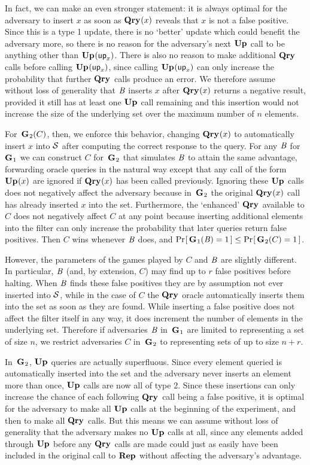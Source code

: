 In fact, we can make an even stronger statement: it is always optimal for the
adversary to insert $x$ as soon as $\textup{\textbf{Qry}}\hspace{0.5pt}(x)$ reveals that $x$ is not a false
positive. Since this is a type 1 update, there is no `better' update which could
benefit the adversary more, so there is no reason for the adversary's next
$\textup{\textbf{Up}}\hspace{0.5pt}$ call to be anything other than $\textup{\textbf{Up}}\hspace{0.5pt}(\mathsf{up}_x)$. There is also no reason to
make additional $\textup{\textbf{Qry}}\hspace{0.5pt}$ calls before calling $\textup{\textbf{Up}}\hspace{0.5pt}(\mathsf{up}_x)$, since calling
$\textup{\textbf{Up}}\hspace{0.5pt}(\mathsf{up}_x)$ can only increase the probability that further $\textup{\textbf{Qry}}\hspace{0.5pt}$ calls
produce an error. We therefore assume without loss of generality that $\mathit{B}$
inserts $x$ after $\textup{\textbf{Qry}}\hspace{0.5pt}(x)$ returns a negative result, provided it still has at
least one $\textup{\textbf{Up}}\hspace{0.5pt}$ call remaining and this insertion would not increase the size
of the underlying set over the maximum number of $n$ elements.

For~$\textup{\textbf{G}}\hspace{0.5pt}_2(C)$, then, we enforce this behavior, changing $\textup{\textbf{Qry}}\hspace{0.5pt}(x)$ to automatically insert $x$ into $\mathcal{S}$ after computing the correct response to the query. For any $\mathit{B}$ for~$\textup{\textbf{G}}\hspace{0.5pt}_1$ we can construct $C$ for~$\textup{\textbf{G}}\hspace{0.5pt}_2$ that simulates $\mathit{B}$ to attain the same advantage, forwarding oracle queries in the natural way except that any call of the form $\textup{\textbf{Up}}\hspace{0.5pt}(x)$ are ignored if $\textup{\textbf{Qry}}\hspace{0.5pt}(x)$ has been called previously. Ignoring these $\textup{\textbf{Up}}\hspace{0.5pt}$ calls does not negatively affect the adversary because in~$\textup{\textbf{G}}\hspace{0.5pt}_2$ the original $\textup{\textbf{Qry}}\hspace{0.5pt}(x)$ call has already inserted $x$ into the set. Furthermore, the `enhanced' $\textup{\textbf{Qry}}\hspace{0.5pt}$ available to $C$ does not negatively affect $C$ at any point because inserting additional elements into the filter can only increase the probability that later queries return false positives. Then $C$ wins whenever $\mathit{B}$ does, and $\Pr\hspace{-1pt}\left[\,\textup{\textbf{G}}\hspace{0.5pt}_1(\mathit{B}) = 1\,\right] \le \Pr\hspace{-1pt}\left[\,\textup{\textbf{G}}\hspace{0.5pt}_2(C) = 1\,\right]$.

However, the parameters of the games played by $C$ and $\mathit{B}$ are slightly different. In particular, $\mathit{B}$ (and, by extension, $C$) may find up to $r$ false positives before halting. When $\mathit{B}$ finds these false positives they are by assumption not ever inserted into $\mathcal{S}$, while in the case of $C$ the $\textup{\textbf{Qry}}\hspace{0.5pt}$ oracle automatically inserts them into the set as soon as they are found. While inserting a false positive does not affect the filter itself in any way, it does increment the number of elements in the underlying set. Therefore if adversaries $\mathit{B}$ in~$\textup{\textbf{G}}\hspace{0.5pt}_1$ are limited to representing a set of size $n$, we restrict adversaries $C$ in~$\textup{\textbf{G}}\hspace{0.5pt}_2$ to representing sets of up to size $n+r$.

In~$\textup{\textbf{G}}\hspace{0.5pt}_2$, $\textup{\textbf{Up}}\hspace{0.5pt}$ queries are actually superfluous. Since every element queried is automatically inserted into the set and the adversary never inserts an element more than once, $\textup{\textbf{Up}}\hspace{0.5pt}$ calls are now all of type 2. Since these insertions can only increase the chance of each following $\textup{\textbf{Qry}}\hspace{0.5pt}$ call being a false positive, it is optimal for the adversary to make all $\textup{\textbf{Up}}\hspace{0.5pt}$ calls at the beginning of the experiment, and then to make all $\textup{\textbf{Qry}}\hspace{0.5pt}$ calls. But this means we can assume without loss of generality that the adversary makes no $\textup{\textbf{Up}}\hspace{0.5pt}$ calls at all, since any elements added through $\textup{\textbf{Up}}\hspace{0.5pt}$ before any $\textup{\textbf{Qry}}\hspace{0.5pt}$ calls are made could just as easily have been included in the original call to $\textup{\textbf{Rep}}\hspace{0.5pt}$ without affecting the adversary's advantage.


